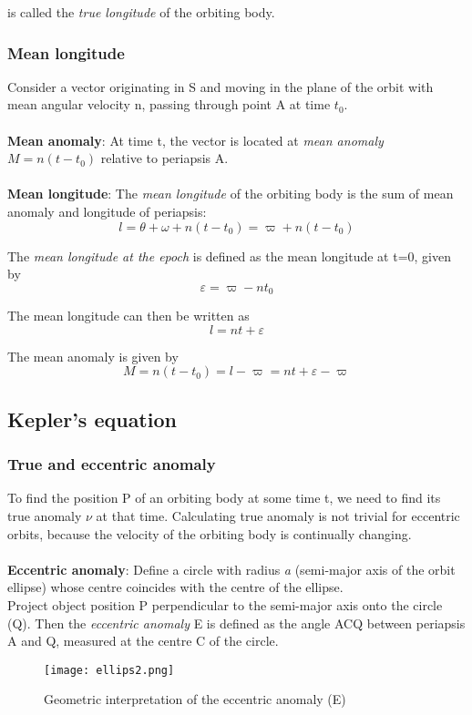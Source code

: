 \documentclass[Orbiter Developer Manual.tex]{subfiles}
\begin{document}
\noindent
is called the \textit{true longitude} of the orbiting body.


\subsubsection{Mean longitude}
Consider a vector originating in S and moving in the plane of the orbit with mean angular velocity n, passing through point A at time $t_{0}$.\\
\\
\textbf{Mean anomaly}: At time t, the vector is located at \textit{mean anomaly} $ M = n(t-t_0) $ relative to periapsis A.\\
\\
\textbf{Mean longitude}: The \textit{mean longitude} of the orbiting body is the sum of mean anomaly and longitude of periapsis:
\[ l = \theta + \omega + n(t-t_0) = \varpi + n(t-t_0) \]

\noindent
The \textit{mean longitude at the epoch} is defined as the mean longitude at t=0, given by
\[ \varepsilon = \varpi - nt_0 \]

\noindent
The mean longitude can then be written as
\[ l = nt + \varepsilon \]

\noindent
The mean anomaly is given by
\[ M = n(t-t_0) = l - \varpi = nt + \varepsilon - \varpi \]


\subsection{Kepler's equation}
\subsubsection{True and eccentric anomaly}
To find the position P of an orbiting body at some time t, we need to find its true anomaly $\nu$ at that time. Calculating true anomaly is not trivial for eccentric orbits, because the velocity of the orbiting body is continually changing.\\
\\
\textbf{Eccentric anomaly}: Define a circle with radius \textit{a} (semi-major axis of the orbit ellipse) whose centre coincides with the centre of the ellipse.\\
Project object position P perpendicular to the semi-major axis onto the circle (Q). Then the \textit{eccentric anomaly} E is defined as the angle ACQ between periapsis A and Q, measured at the centre C of the circle.

\begin{figure}[H]
  \centering
  \texttt{[image: ellips2.png]}
  \caption{Geometric interpretation of the eccentric anomaly (E)}
\end{figure}
\end{document}
